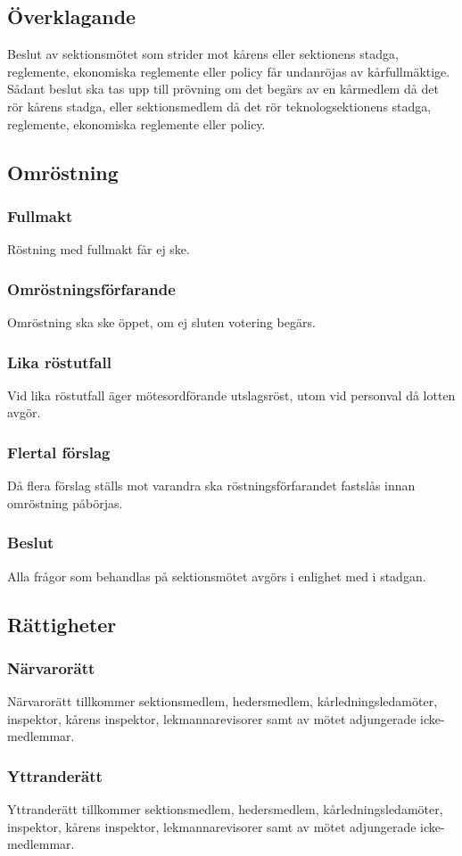 \subsection{Överklagande}
Beslut av sektionsmötet som strider mot kårens eller sektionens stadga, reglemente, ekonomiska reglemente eller policy får undanröjas av kårfullmäktige. Sådant beslut ska tas upp till prövning om det begärs av en kårmedlem då det rör kårens stadga, eller sektionsmedlem då det rör teknologsektionens stadga, reglemente, ekonomiska reglemente eller policy.
\subsection{Omröstning}
\subsubsection{Fullmakt}
Röstning med fullmakt får ej ske.
\subsubsection{Omröstningsförfarande}
Omröstning ska ske öppet, om ej sluten votering begärs.
\subsubsection{Lika röstutfall}
Vid lika röstutfall äger mötesordförande utslagsröst, utom vid personval då lotten avgör.
\subsubsection{Flertal förslag}
Då flera förslag ställs mot varandra ska röstningsförfarandet fastslås innan omröstning påbörjas.
\subsubsection{Beslut}
Alla frågor som behandlas på sektionsmötet avgörs i enlighet med  i stadgan.
\subsection{Rättigheter}
\subsubsection{Närvarorätt}
Närvarorätt tillkommer sektionsmedlem, hedersmedlem, kårledningsledamöter, inspektor, kårens inspektor, lekmannarevisorer samt av mötet adjungerade icke-medlemmar.
\subsubsection{Yttranderätt}
Yttranderätt tillkommer sektionsmedlem, hedersmedlem, kårledningsledamöter, inspektor, kårens inspektor, lekmannarevisorer samt av mötet adjungerade icke-medlemmar.
